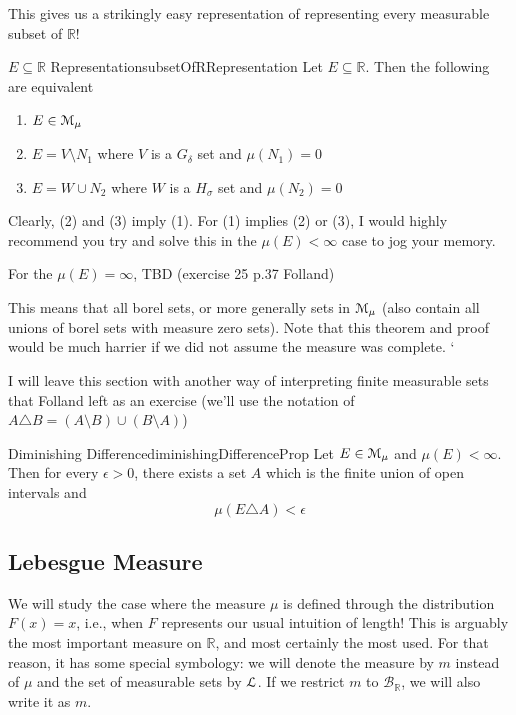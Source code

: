 \documentclass[oneside]{book}
\newcommand{\R}{\mathbb{R}}
\newcommand{\MM}{\EuScript{M}}
\newcommand{\EL}{\EuScript{L}}
\newcommand{\BB}{\mathcal{B}}
\newcommand{\sse}{\subseteq}
\begin{document}
This gives us a strikingly easy representation of representing every measurable subset of $\R$! 

\begin{thm}{$E \sse \R$ Representation}{subsetOfRRepresentation}
	Let $E \sse \R$. Then the following are equivalent
	\begin{enumerate}
		\item $E \in \MM_\mu$
		\item $E = V\setminus N_1$ where $V$ is a $G_\delta$ set and $\mu(N_1) = 0$
		\item $E = W\cup N_2$ where $W$ is a $H_\sigma$ set and $\mu(N_2) = 0$
	\end{enumerate}
\end{thm}

\begin{Proof}
	Clearly, (2) and (3) imply (1). For (1) implies (2) or (3), I would highly recommend you try and solve this in the
	$\mu(E) < \infty$ case to jog your memory. 

	For the $\mu(E) = \infty$, TBD (exercise 25 p.37 Folland)
\end{Proof}

This means that all borel sets, or more generally sets in $\MM_\mu$ (also contain all unions of borel sets with measure
zero sets). Note that this theorem and proof would be much harrier if we did not assume the measure was complete. `

I will leave this section with another way of interpreting finite measurable sets that Folland left as an exercise
(we'll use the notation of $A\triangle B = (A\setminus B)\cup (B\setminus A)$)

\begin{prop}{Diminishing Difference}{diminishingDifferenceProp}
	Let $E \in \MM_\mu$ and $\mu(E) < \infty$. Then for every $\epsilon > 0$, there exists a set $A$ which is the finite
	union of open intervals and
	\[
		\mu(E\triangle A) < \epsilon
	\]
\end{prop}

\subsection{Lebesgue Measure}

We will study the case where the measure $\mu$ is defined through the distribution $F(x) = x$, i.e., when $F$ represents
our usual intuition of length! This is arguably the most important measure on $\R$, and most certainly the most used.
For that reason, it has some special symbology: we will denote the measure by $m$ instead of $\mu$ and the set of
measurable sets by $\EL$. If we restrict $m$ to $\BB_\R$, we will also write it as $m$. 
\end{document}
